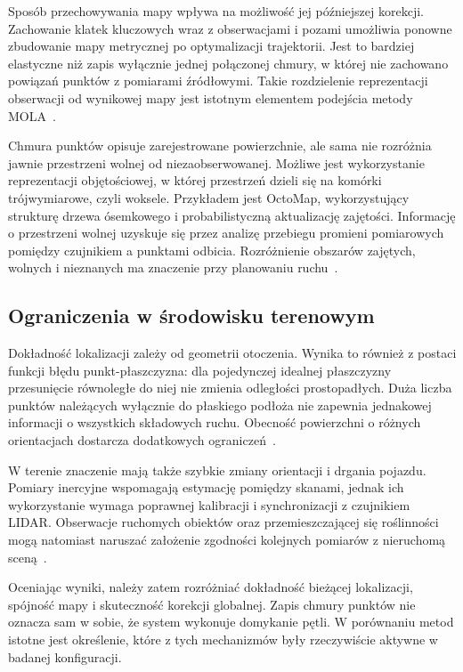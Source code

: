 \documentclass[a4paper,twoside,12pt]{book}
\begin{document}
Sposób przechowywania mapy wpływa na możliwość jej późniejszej korekcji. Zachowanie klatek kluczowych wraz z obserwacjami i pozami umożliwia ponowne zbudowanie mapy metrycznej po optymalizacji trajektorii. Jest to bardziej elastyczne niż zapis wyłącznie jednej połączonej chmury, w której nie zachowano powiązań punktów z pomiarami źródłowymi. Takie rozdzielenie reprezentacji obserwacji od wynikowej mapy jest istotnym elementem podejścia metody MOLA~\cite{blanco2025mola_lo}.

Chmura punktów opisuje zarejestrowane powierzchnie, ale sama nie rozróżnia jawnie przestrzeni wolnej od niezaobserwowanej. Możliwe jest wykorzystanie reprezentacji objętościowej, w której przestrzeń dzieli się na komórki trójwymiarowe, czyli woksele. Przykładem jest OctoMap, wykorzystujący strukturę drzewa ósemkowego i probabilistyczną aktualizację zajętości. Informację o przestrzeni wolnej uzyskuje się przez analizę przebiegu promieni pomiarowych pomiędzy czujnikiem a punktami odbicia. Rozróżnienie obszarów zajętych, wolnych i nieznanych ma znaczenie przy planowaniu ruchu~\cite{rb34_hornung2013}.

\subsection{Ograniczenia w środowisku terenowym}

Dokładność lokalizacji zależy od geometrii otoczenia. Wynika to również z postaci funkcji błędu punkt-płaszczyzna: dla pojedynczej idealnej płaszczyzny przesunięcie równoległe do niej nie zmienia odległości prostopadłych. Duża liczba punktów należących wyłącznie do płaskiego podłoża nie zapewnia jednakowej informacji o wszystkich składowych ruchu. Obecność powierzchni o różnych orientacjach dostarcza dodatkowych ograniczeń~\cite{lidar_inertial_odometry_tight_coupled}.

W terenie znaczenie mają także szybkie zmiany orientacji i drgania pojazdu. Pomiary inercyjne wspomagają estymację pomiędzy skanami, jednak ich wykorzystanie wymaga poprawnej kalibracji i synchronizacji z czujnikiem LIDAR. Obserwacje ruchomych obiektów oraz przemieszczającej się roślinności mogą natomiast naruszać założenie zgodności kolejnych pomiarów z nieruchomą sceną~\cite{9341176,rb34_cadena2016}.

Oceniając wyniki, należy zatem rozróżniać dokładność bieżącej lokalizacji, spójność mapy i skuteczność korekcji globalnej. Zapis chmury punktów nie oznacza sam w sobie, że system wykonuje domykanie pętli. W porównaniu metod istotne jest określenie, które z tych mechanizmów były rzeczywiście aktywne w badanej konfiguracji.
\end{document}
